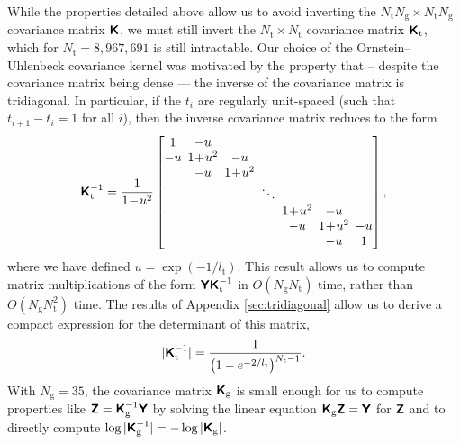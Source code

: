 \documentclass[fleqn,usenatbib]{mnras}
\begin{document}
While the properties detailed above allow us to avoid inverting the $N_\text{t}N_\text{g} \times N_\text{t}N_\text{g}$ covariance matrix $\textbf{\textsf{K}}$, we must still invert the $N_\text{t} \times N_\text{t}$ covariance matrix $\textbf{\textsf{K}}_\text{t}$, which for $N_\text{t} = 8,967,691$ is still intractable. Our choice of the Ornstein–Uhlenbeck covariance kernel was motivated by the property that -- despite the covariance matrix being dense --- the inverse of the covariance matrix is tridiagonal. In particular, if the $t_i$ are regularly unit-spaced (such that $t_{i+1}-t_i = 1$ for all $i$), then the inverse covariance matrix reduces to the form
\begin{equation}
    \setlength{\arraycolsep}{2.5pt}
    \medmuskip = 1mu
    \mathbfss{K}_\text{t}^{-1} = \frac{1}{1-u^2}
    \begin{bmatrix} 
    1 & -u &   &        &   &   &   \\
    -u & 1+u^2 & -u &        &   &   &   \\
      & -u & 1+u^2 &        &   &   &   \\
      &   &   & \ddots &   &   &   \\
      &   &   &        & 1+u^2 & -u &   \\
      &   &   &        & -u & 1+u^2 & -u \\
      &   &   &        &   & -u & 1 
    \end{bmatrix}, \label{eq:tridiagonal}
\end{equation}
where we have defined $u=\exp(-1/l_\text{t})$. This result allows us to compute matrix multiplications of the form $\textbf{\textsf{Y}}\textbf{\textsf{K}}_\text{t}^{-1}$ in $O(N_\text{g}N_\text{t})$ time, rather than $O(N_\text{g}N_\text{t}^2)$ time. The results of Appendix \ref{sec:tridiagonal} allow us to derive a compact expression for the determinant of this matrix,
\begin{equation}
    |\textbf{\textsf{K}}_\text{t}^{-1}| = \frac{1}{\left(1-e^{-2/l_\text{t}}\right)^{N_\text{t}-1}}.
\end{equation}
With $N_\text{g}=35$, the covariance matrix $\textbf{\textsf{K}}_\text{g}$ is small enough for us to compute properties like $\textbf{\textsf{Z}}=\textbf{\textsf{K}}_\text{g}^{-1}\textbf{\textsf{Y}}$ by solving the linear equation $\textbf{\textsf{K}}_\text{g}\textbf{\textsf{Z}}=\textbf{\textsf{Y}}$ for $\textbf{\textsf{Z}}$ and to directly compute $\log|\textbf{\textsf{K}}_\text{g}^{-1}|=-\log|\textbf{\textsf{K}}_\text{g}|$.
\end{document}
